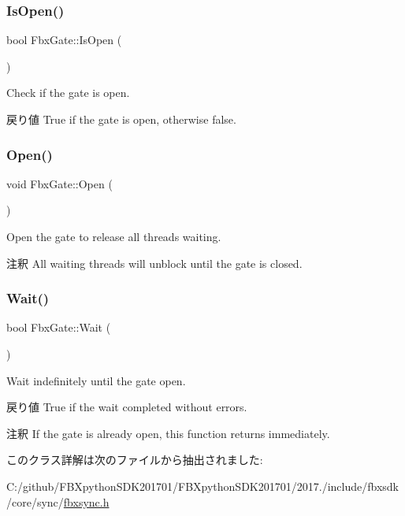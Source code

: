 \subsubsection{\texorpdfstring{Is\+Open()}{IsOpen()}}
{\footnotesize\ttfamily bool Fbx\+Gate\+::\+Is\+Open (\begin{DoxyParamCaption}{ }\end{DoxyParamCaption})}

Check if the gate is open. \begin{DoxyReturn}{戻り値}
True if the gate is open, otherwise false. 
\end{DoxyReturn}
\mbox{\label{class_fbx_gate_acd9a45eb0ef7d06f2a4a7f5954555310}} 
\subsubsection{\texorpdfstring{Open()}{Open()}}
{\footnotesize\ttfamily void Fbx\+Gate\+::\+Open (\begin{DoxyParamCaption}{ }\end{DoxyParamCaption})}

Open the gate to release all threads waiting. \begin{DoxyRemark}{注釈}
All waiting threads will unblock until the gate is closed. 
\end{DoxyRemark}
\mbox{\label{class_fbx_gate_ad3d9e530f43a6f446c2d09364153c918}} 
\subsubsection{\texorpdfstring{Wait()}{Wait()}}
{\footnotesize\ttfamily bool Fbx\+Gate\+::\+Wait (\begin{DoxyParamCaption}{ }\end{DoxyParamCaption})}

Wait indefinitely until the gate open. \begin{DoxyReturn}{戻り値}
True if the wait completed without errors. 
\end{DoxyReturn}
\begin{DoxyRemark}{注釈}
If the gate is already open, this function returns immediately. 
\end{DoxyRemark}


このクラス詳解は次のファイルから抽出されました\+:\begin{DoxyCompactItemize}
\item 
C\+:/github/\+F\+B\+Xpython\+S\+D\+K201701/\+F\+B\+Xpython\+S\+D\+K201701/2017./include/fbxsdk/core/sync/\hyperlink{fbxsync_8h}{fbxsync.\+h}\end{DoxyCompactItemize}
